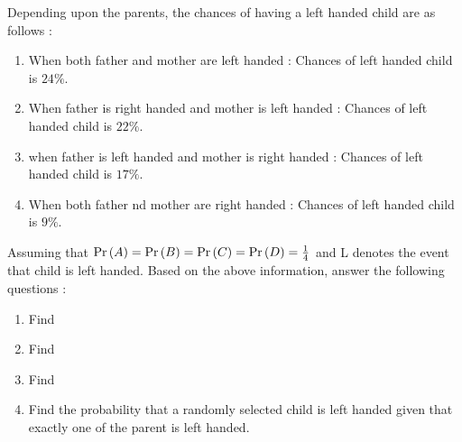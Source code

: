 \begin{enumerate}
Depending upon the parents, the chances of having a left handed child are as follows :\\
\begin{enumerate}
\item   When both father and mother are left handed :
        Chances of left handed child is $24\%$.
\item   When father is right handed and mother is left handed :
        Chances of left handed child is $22\%$.
\item   when father is left handed and mother is right handed :
        Chances of left handed child is $17\%$.
\item   When both father nd mother are right handed :
        Chances of left handed child is $9\%$.
\end{enumerate}
Assuming that $\Pr\left(A\right)=\Pr\left(B\right)=\Pr\left(C\right)=\Pr\left(D\right)=\frac{1}{4}$ and L denotes the event that child is left handed.
Based on the above information, answer the following questions :\\
\begin{enumerate}
	\item    Find 
	\item    Find 
	\item    Find 
\item    Find the probability that a randomly selected child is left handed given that exactly one of the parent is left handed.
\end{enumerate}
\end{enumerate}
